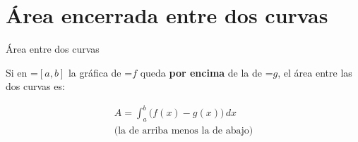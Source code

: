 \documentclass[11pt,a4paper]{article}
\newcommand{\fmm}[1]{\setbox0=\hbox{$#1$}\ifdim\wd0>\linewidth\[#1\]\else\mbox{\box0}\fi}
\begin{document}
  
\section{Área encerrada entre dos curvas}\hypertarget{sec7}{}

  

  
\begin{fmdef}{Área entre dos curvas}
\par\noindent \begin{minipage}[t]{0.48\linewidth}\vspace{0pt}\raggedright Si en \fmm{[a,b]} la gráfica de \fmm{f} queda \textbf{por encima} de la de \fmm{g}, el área entre las dos curvas es:

          
\[\begin{gathered}A=\int_a^b\big(f(x)-g(x)\big)\,dx\\\text{(la de arriba menos la de abajo)}\end{gathered}\]

          


\end{minipage}
\end{fmdef}
\end{document}

